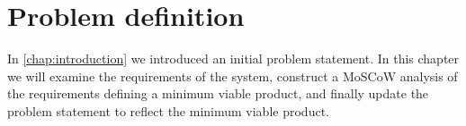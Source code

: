 \chapter{Problem definition}
In \autoref{chap:introduction} we introduced an initial problem statement.
In this chapter we will examine the requirements of the system, construct a MoSCoW analysis of the requirements defining a minimum viable product, and finally update the problem statement to reflect the minimum viable product.


